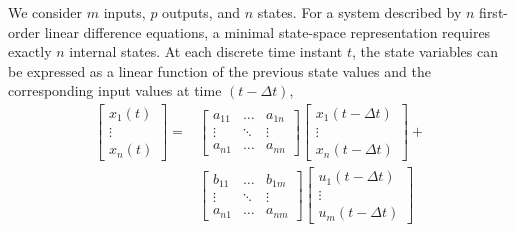 We consider $m$ inputs, $p$ outputs, and $n$ states. For a system described by $n$ first-order linear difference equations, a minimal state-space representation requires exactly $n$ internal states. At each discrete time instant $t$, the state variables can be expressed as a linear function of the previous state values and the corresponding input values at time $(t - \Delta t)$,
\begin{equation}
    \begin{aligned}
{\left[\begin{array}{c}
x_{1}(t) \\
\vdots \\
x_{n}(t)
\end{array}\right]=} & {\left[\begin{array}{ccc}
a_{11} & \ldots & a_{1 n} \\
\vdots & \ddots & \vdots \\
a_{n 1} & \ldots & a_{n n}
\end{array}\right]\left[\begin{array}{c}
x_{1}(t-\Delta t) \\
\vdots \\
x_{n}(t-\Delta t)
\end{array}\right]+} \\
& {\left[\begin{array}{ccc}
b_{11} & \ldots & b_{1 m} \\
\vdots & \ddots & \vdots \\
a_{n 1} & \ldots & a_{n m}
\end{array}\right]\left[\begin{array}{c}
u_{1}(t-\Delta t) \\
\vdots \\
u_{m}(t-\Delta t)
\end{array}\right] }
\end{aligned}
\label{eq:sv_xau}
\end{equation}


